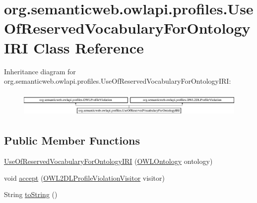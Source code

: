 \hypertarget{classorg_1_1semanticweb_1_1owlapi_1_1profiles_1_1_use_of_reserved_vocabulary_for_ontology_i_r_i}{\section{org.\-semanticweb.\-owlapi.\-profiles.\-Use\-Of\-Reserved\-Vocabulary\-For\-Ontology\-I\-R\-I Class Reference}
\label{classorg_1_1semanticweb_1_1owlapi_1_1profiles_1_1_use_of_reserved_vocabulary_for_ontology_i_r_i}
}
Inheritance diagram for org.\-semanticweb.\-owlapi.\-profiles.\-Use\-Of\-Reserved\-Vocabulary\-For\-Ontology\-I\-R\-I\-:\begin{figure}[H]
\begin{center}
\leavevmode
\includegraphics[height=1.258427cm]{classorg_1_1semanticweb_1_1owlapi_1_1profiles_1_1_use_of_reserved_vocabulary_for_ontology_i_r_i}
\end{center}
\end{figure}
\subsection*{Public Member Functions}
\begin{DoxyCompactItemize}
\item 
\hyperlink{classorg_1_1semanticweb_1_1owlapi_1_1profiles_1_1_use_of_reserved_vocabulary_for_ontology_i_r_i_ac2c93f0a3c9b0aa988a79a79a9e1f9cb}{Use\-Of\-Reserved\-Vocabulary\-For\-Ontology\-I\-R\-I} (\hyperlink{interfaceorg_1_1semanticweb_1_1owlapi_1_1model_1_1_o_w_l_ontology}{O\-W\-L\-Ontology} ontology)
\item 
void \hyperlink{classorg_1_1semanticweb_1_1owlapi_1_1profiles_1_1_use_of_reserved_vocabulary_for_ontology_i_r_i_a210e91e55556b2f9fae9923d2a67bfde}{accept} (\hyperlink{interfaceorg_1_1semanticweb_1_1owlapi_1_1profiles_1_1_o_w_l2_d_l_profile_violation_visitor}{O\-W\-L2\-D\-L\-Profile\-Violation\-Visitor} visitor)
\item 
String \hyperlink{classorg_1_1semanticweb_1_1owlapi_1_1profiles_1_1_use_of_reserved_vocabulary_for_ontology_i_r_i_aad06ec7698f4463e2ec9b115e848ca9b}{to\-String} ()
\end{DoxyCompactItemize}


